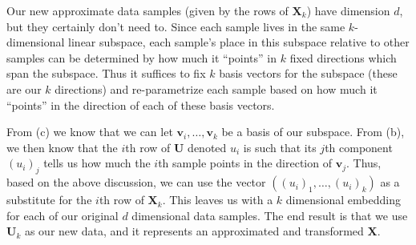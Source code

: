 Our new approximate data samples (given by the rows of $\textbf{X}_k$) have dimension $d$, but they certainly don't need to. Since each sample lives in the same $k$-dimensional linear subspace, each sample's place in this subspace relative to other samples can be determined by how much it ``points'' in $k$ fixed directions which span the subspace. Thus it suffices to fix $k$ basis vectors for the subspace (these are our $k$ directions) and re-parametrize each sample based on how much it ``points'' in the direction of each of these basis vectors. \newline 

From (c) we know that we can let $\textbf{v}_i, \dots,\textbf{v}_k$ be a basis of our subspace. From (b), we then know that the $i$th row of $\textbf{U}$ denoted $u_i$ is such that its $j$th component $(u_i)_{j}$ tells us how much the $i$th sample points in the direction of $\textbf{v}_j$. Thus, based on the above discussion, we can use the vector $((u_i)_1, \dots, (u_{i})_k)$ as a substitute for the $i$th row of $\textbf{X}_k$. This leaves us with a $k$ dimensional embedding for each of our original $d$ dimensional data samples. The end result is that we use $\textbf{U}_k$ as our new data, and it represents an approximated and transformed $\textbf{X}$.